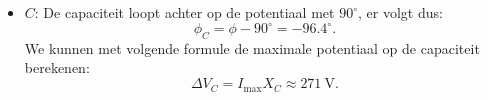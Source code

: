 \begin{enumerate}[(a)]
\begin{description}[labelwidth=1.5cm, leftmargin=!]
\begin{itemize}
\begin{equation*}
                        \phi_L = \phi + 90^\circ = 83.6^\circ.
                    \end{equation*} 
                    We kunnen met volgende formule de maximale potentiaal op de zelfinductie berekenen:
                    \begin{equation*}
                        \Delta V_L = I_{\text{max}} X_L \approx 233 \ \text{V}.
                    \end{equation*}
                \item $C$:
                    De capaciteit loopt achter op de potentiaal met $90^\circ$, er volgt dus:
                    \begin{equation*}
                        \phi_C = \phi - 90^\circ = -96.4^\circ.
                    \end{equation*}
                    We kunnen met volgende formule de maximale potentiaal op de capaciteit berekenen:
                    \begin{equation*}
                        \Delta V_C = I_{\text{max}} X_C \approx 271 \ \text{V}.
                    \end{equation*}
            \end{itemize}
        \end{description}
\end{enumerate}

\vspace{1cm}